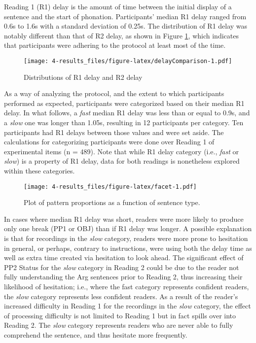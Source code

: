 \documentclass[11pt,oneside]{book}
\begin{document}
Reading 1 (R1) delay is the amount of time between the initial display of a sentence and the start of phonation. Participants' median R1 delay ranged from 0.6s to 1.6s with a standard deviation of 0.25s. The distribution of R1 delay was notably different than that of R2 delay, as shown in Figure \ref{fig:delayComparison}, which indicates that participants were adhering to the protocol at least most of the time.

\begin{figure}
\centering
\texttt{[image: 4-results\_files/figure-latex/delayComparison-1.pdf]}
\caption{\label{fig:delayComparison}Distributions of R1 delay and R2 delay}
\end{figure}

As a way of analyzing the protocol, and the extent to which participants performed as expected, participants were categorized based on their median R1 delay. In what follows, a \emph{fast} median R1 delay was less than or equal to 0.9s, and a \emph{slow} one was longer than 1.05s, resulting in 12 participants per category. Ten participants had R1 delays between those values and were set aside. The calculations for categorizing participants were done over Reading 1 of experimental items (n = 489). Note that while R1 delay category (i.e., \emph{fast} or \emph{slow}) is a property of R1 delay, data for both readings is nonetheless explored within these categories.

\begin{figure}
\centering
\texttt{[image: 4-results\_files/figure-latex/facet-1.pdf]}
\caption{\label{fig:facet}Plot of pattern proportions as a function of sentence type.}
\end{figure}

In cases where median R1 delay was short, readers were more likely to produce only one break (PP1 or OBJ) than if R1 delay was longer. A possible explanation is that for recordings in the \emph{slow} category, readers were more prone to hesitation in general, or perhaps, contrary to instructions, were using both the delay time as well as extra time created via hesitation to look ahead. The significant effect of PP2 Status for the \emph{slow} category in Reading 2 could be due to the reader not fully understanding the Arg sentences prior to Reading 2, thus increasing their likelihood of hesitation; i.e., where the fast category represents confident readers, the \emph{slow} category represents less confident readers. As a result of the reader's increased difficulty in Reading 1 for the recordings in the \emph{slow} category, the effect of processing difficulty is not limited to Reading 1 but in fact spills over into Reading 2. The \emph{slow} category represents readers who are never able to fully comprehend the sentence, and thus hesitate more frequently.
\end{document}
